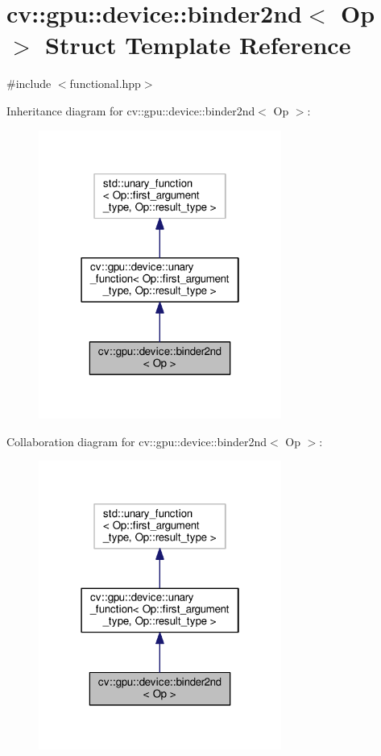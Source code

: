 \hypertarget{structcv_1_1gpu_1_1device_1_1binder2nd}{\section{cv\-:\-:gpu\-:\-:device\-:\-:binder2nd$<$ Op $>$ Struct Template Reference}
\label{structcv_1_1gpu_1_1device_1_1binder2nd}
}


{\ttfamily \#include $<$functional.\-hpp$>$}



Inheritance diagram for cv\-:\-:gpu\-:\-:device\-:\-:binder2nd$<$ Op $>$\-:\nopagebreak
\begin{figure}[H]
\begin{center}
\leavevmode
\includegraphics[width=226pt]{structcv_1_1gpu_1_1device_1_1binder2nd__inherit__graph}
\end{center}
\end{figure}


Collaboration diagram for cv\-:\-:gpu\-:\-:device\-:\-:binder2nd$<$ Op $>$\-:\nopagebreak
\begin{figure}[H]
\begin{center}
\leavevmode
\includegraphics[width=226pt]{structcv_1_1gpu_1_1device_1_1binder2nd__coll__graph}
\end{center}
\end{figure}

